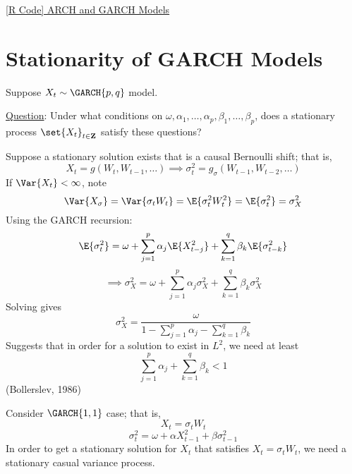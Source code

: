 \href{https://github.com/Hextical/university-notes/blob/master/year-3/semester-2/STAT 443/code/8.4 - ARCH and GARCH Update.R}{[R Code] ARCH and GARCH Models}
\section{Stationarity of GARCH Models}
Suppose $ X_t \sim \GARCH{p,q} $ model.

\underline{Question}: Under what conditions on $ \omega,\alpha_1,\ldots,\alpha_p,
    \beta_1,\ldots,\beta_p $, does a stationary process $ \set{X_t}_{t\in\mathbf{Z}} $
satisfy these questions?

\begin{Remark}{}{}
    Suppose a stationary solution exists that is a causal Bernoulli shift; that is,
    \[ X_t=g(W_t,W_{t-1},\ldots) \implies \sigma_t^2=g_\sigma(W_{t-1},W_{t-2},\ldots) \]
    If $ \Var{X_t}<\infty $, note
    \[ \Var{X_\sigma}=\Var{\sigma_t W_t}=\E{\sigma_t^2 W_t^2}=\E{\sigma_t^2}=\sigma_X^2 \]
    Using the GARCH recursion:
    \[ \E{\sigma_t^2}=\omega+\sum_{j=1}^{p} \alpha_j \E{X_{t-j}^2}+\sum_{k=1}^{q} \beta_k \E{\sigma^2_{t-k}} \]
    \[ \implies\sigma_X^2=\omega+\sum_{j=1}^{p} \alpha_j \sigma_X^2 +\sum_{k=1}^{q}\beta_k \sigma^2_X  \]
    Solving gives
    \[ \sigma_X^2=\frac{\omega}{1-\sum_{j=1}^{p} \alpha_j-\sum_{k=1}^{q} \beta_k}  \]
    Suggests that in order for a solution to exist in $ L^2 $, we need at least
    \[ \sum_{j=1}^{p} \alpha_j + \sum_{k=1}^{q} \beta_k <1 \]
    (Bollerslev, 1986)
\end{Remark}
Consider $ \GARCH{1,1} $ case; that is,
\[ X_t=\sigma_t W_t \]
\[ \sigma_t^2=\omega+\alpha X_{t-1}^2+\beta \sigma_{t-1}^2 \]
In order to get a stationary solution for $ X_t $ that satisfies
$ X_t=\sigma_t W_t $, we need a stationary casual variance process.

